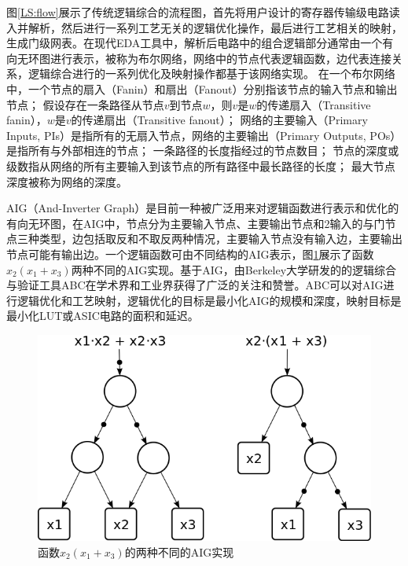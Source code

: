 图\ref{LS:flow}展示了传统逻辑综合的流程图，首先将用户设计的寄存器传输级电路读入并解析，然后进行一系列工艺无关的逻辑优化操作，最后进行工艺相关的映射，生成门级网表。在现代EDA工具中，解析后电路中的组合逻辑部分通常由一个有向无环图进行表示，被称为布尔网络\cite{FPGA:CLB_Anderson}，网络中的节点代表逻辑函数，边代表连接关系，逻辑综合进行的一系列优化及映射操作都基于该网络实现。
在一个布尔网络中\cite{LS:exact_rewriting,FPGA:Jason_Cong_1993,LS:Verification_after_synthesis}，一个节点的扇入（Fanin）和扇出（Fanout）分别指该节点的输入节点和输出节点；
假设存在一条路径从节点$v$到节点$w$，则$v$是$w$的传递扇入（Transitive fanin），$w$是$v$的传递扇出（Transitive fanout）；
网络的主要输入（Primary Inputs, PIs）是指所有的无扇入节点，网络的主要输出（Primary Outputs, POs）是指所有与外部相连的节点；
一条路径的长度指经过的节点数目；
节点的深度或级数指从网络的所有主要输入到该节点的所有路径中最长路径的长度；
最大节点深度被称为网络的深度。



AIG（And-Inverter Graph）是目前一种被广泛用来对逻辑函数进行表示和优化的有向无环图\cite{LS:AIG}，在AIG中，节点分为主要输入节点、主要输出节点和2输入的与门节点三种类型，边包括取反和不取反两种情况，主要输入节点没有输入边，主要输出节点可能有输出边。一个逻辑函数可由不同结构的AIG表示，图\ref{LS:two_AIG}展示了函数$x_2 (x_1 + x_3)$两种不同的AIG实现。基于AIG，由Berkeley大学研发的的逻辑综合与验证工具ABC\cite{LS:ABC}在学术界和工业界获得了广泛的关注和赞誉。ABC可以对AIG进行逻辑优化和工艺映射，逻辑优化的目标是最小化AIG的规模和深度，映射目标是最小化LUT或ASIC电路的面积和延迟。

\begin{figure}[!htbp]
    \centering
    \includegraphics[width=0.6\linewidth]{./figs/LS-two_AIG.png}
    \caption{函数$x_2 (x_1 + x_3)$的两种不同的AIG实现}
    \label{LS:two_AIG}
\end{figure}


